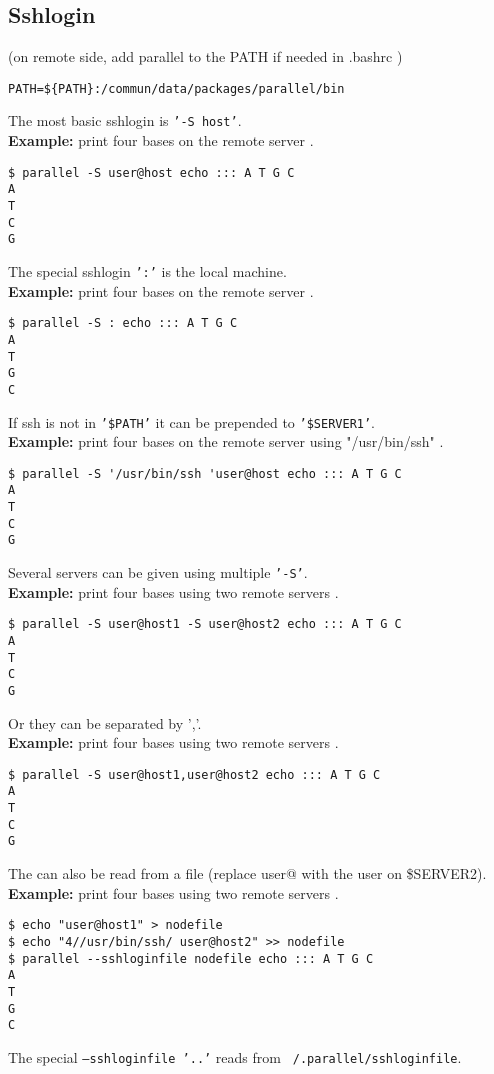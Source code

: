 \documentclass{article}
\newcommand{\example}[1]{
\textbf{Example: } {\color[rgb]{0,0,1} #1 } .
}
\newcommand{\cmdoption}[1]{\texttt{'#1'}}
\begin{document}
\subsection{Sshlogin}
(on remote side, add parallel to the PATH if needed in .bashrc )
\begin{lstlisting}
PATH=${PATH}:/commun/data/packages/parallel/bin
\end{lstlisting}

The most basic sshlogin is \cmdoption{-S host}.\\
\example{print four bases on the remote server}
\begin{lstlisting}
$ parallel -S user@host echo ::: A T G C
A
T
C
G
\end{lstlisting}
The special sshlogin \cmdoption{:} is the local machine.\\
\example{print four bases on the remote server}
\begin{lstlisting}
$ parallel -S : echo ::: A T G C
A
T
G
C
\end{lstlisting}

If ssh is not in \cmdoption{\$PATH} it can be prepended to \cmdoption{\$SERVER1}.\\
\example{print four bases on the remote server using "/usr/bin/ssh" }
\begin{lstlisting}
$ parallel -S '/usr/bin/ssh 'user@host echo ::: A T G C
A
T
C
G
\end{lstlisting}
Several servers can be given using multiple \cmdoption{-S}.\\
\example{print four bases using two remote servers}
\begin{lstlisting}
$ parallel -S user@host1 -S user@host2 echo ::: A T G C
A
T
C
G
\end{lstlisting}
Or they can be separated by ','.\\
\example{print four bases using two remote servers}
\begin{lstlisting}
$ parallel -S user@host1,user@host2 echo ::: A T G C
A
T
C
G
\end{lstlisting}

The can also be read from a file (replace user@ with the user on \$SERVER2).\\
\example{print four bases using two remote servers}
\begin{lstlisting}
$ echo "user@host1" > nodefile
$ echo "4//usr/bin/ssh/ user@host2" >> nodefile 
$ parallel --sshloginfile nodefile echo ::: A T G C
A
T
G
C
\end{lstlisting}
The special \texttt{--sshloginfile '..'} reads from \texttt{~/.parallel/sshloginfile}.
\end{document}
